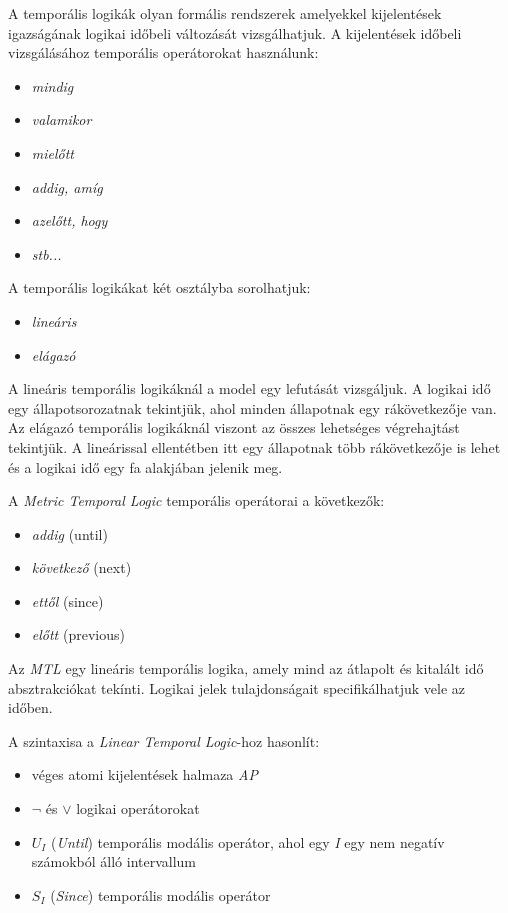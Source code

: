 A temporális logikák olyan formális rendszerek amelyekkel kijelentések igazságának logikai időbeli változását vizsgálhatjuk.
A kijelentések időbeli vizsgálásához temporális operátorokat használunk:
\begin{itemize}
    \item \textit{mindig}
    \item \textit{valamikor}
    \item \textit{mielőtt}
    \item \textit{addig, amíg}
    \item \textit{azelőtt, hogy}
    \item \textit{stb...}
\end{itemize}
A temporális logikákat két osztályba sorolhatjuk:
\begin{itemize}
    \item \textit{lineáris}
    \item \textit{elágazó}
\end{itemize}
A lineáris temporális logikáknál a model egy lefutását vizsgáljuk.
A logikai idő egy állapotsorozatnak tekintjük, ahol minden állapotnak egy rákövetkezője van.
Az elágazó temporális logikáknál viszont az összes lehetséges végrehajtást tekintjük.
A lineárissal ellentétben itt egy állapotnak több rákövetkezője is lehet és a logikai idő egy fa alakjában jelenik meg.

A \textit{Metric Temporal Logic} temporális operátorai a következők:
\begin{itemize}
    \item \textit{addig} (until)
    \item \textit{következő} (next)
    \item \textit{ettől} (since)
    \item \textit{előtt} (previous)
\end{itemize}
Az \textit{MTL} egy lineáris temporális logika, amely mind az átlapolt és kitalált idő absztrakciókat tekínti.
Logikai jelek tulajdonságait specifikálhatjuk vele az időben.

A szintaxisa a \textit{Linear Temporal Logic}-hoz hasonlít:
\begin{itemize}
    \item véges atomi kijelentések halmaza \textit{AP}
    \item $\neg$ és $\lor$ logikai operátorokat
    \item $U_I$ (\textit{Until}) temporális modális operátor, ahol egy \textit{I} egy nem negatív számokból álló intervallum
    \item $S_I$ (\textit{Since}) temporális modális operátor
\end{itemize}

